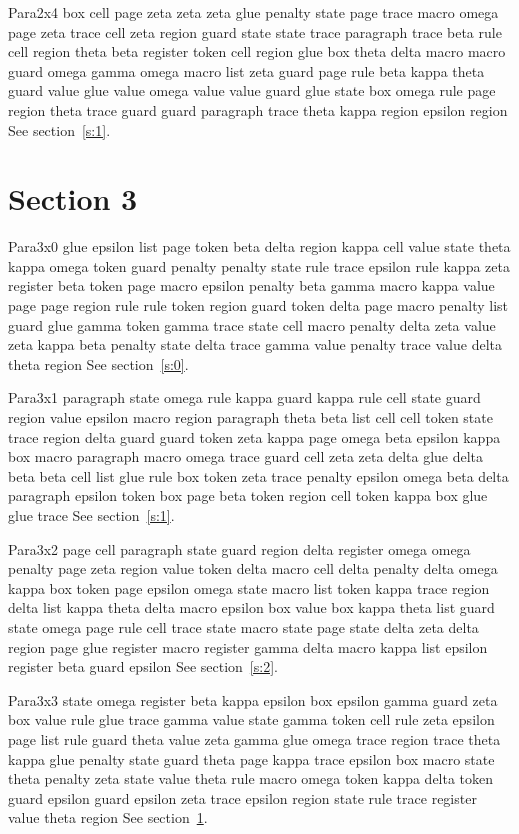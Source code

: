 \documentclass{article}
\begin{document}
Para2x4 box cell page zeta zeta zeta glue penalty state page trace macro omega page zeta trace cell zeta region guard state state trace paragraph trace beta rule cell region theta beta register token cell region glue box theta delta macro macro guard omega gamma omega macro list zeta guard page rule beta kappa theta guard value glue value omega value value guard glue state box omega rule page region theta trace guard guard paragraph trace theta kappa region epsilon region See section~\ref{s:1}.

\section{Section 3}\label{s:3}
Para3x0 glue epsilon list page token beta delta region kappa cell value state theta kappa omega token guard penalty penalty state rule trace epsilon rule kappa zeta register beta token page macro epsilon penalty beta gamma macro kappa value page page region rule rule token region guard token delta page macro penalty list guard glue gamma token gamma trace state cell macro penalty delta zeta value zeta kappa beta penalty state delta trace gamma value penalty trace value delta theta region See section~\ref{s:0}.

Para3x1 paragraph state omega rule kappa guard kappa rule cell state guard region value epsilon macro region paragraph theta beta list cell cell token state trace region delta guard guard token zeta kappa page omega beta epsilon kappa box macro paragraph macro omega trace guard cell zeta zeta delta glue delta beta beta cell list glue rule box token zeta trace penalty epsilon omega beta delta paragraph epsilon token box page beta token region cell token kappa box glue glue trace See section~\ref{s:1}.

Para3x2 page cell paragraph state guard region delta register omega omega penalty page zeta region value token delta macro cell delta penalty delta omega kappa box token page epsilon omega state macro list token kappa trace region delta list kappa theta delta macro epsilon box value box kappa theta list guard state omega page rule cell trace state macro state page state delta zeta delta region page glue register macro register gamma delta macro kappa list epsilon register beta guard epsilon See section~\ref{s:2}.

Para3x3 state omega register beta kappa epsilon box epsilon gamma guard zeta box value rule glue trace gamma value state gamma token cell rule zeta epsilon page list rule guard theta value zeta gamma glue omega trace region trace theta kappa glue penalty state guard theta page kappa trace epsilon box macro state theta penalty zeta state value theta rule macro omega token kappa delta token guard epsilon guard epsilon zeta trace epsilon region state rule trace register value theta region See section~\ref{s:3}.
\end{document}
